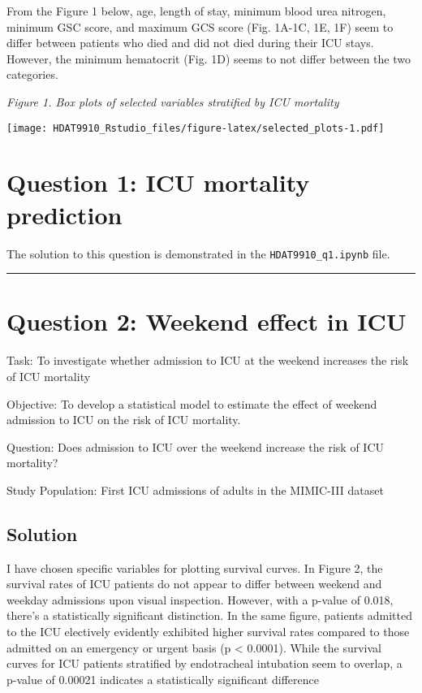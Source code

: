 \documentclass[
]{article}
\begin{document}
From the Figure 1 below, age, length of stay, minimum blood urea
nitrogen, minimum GSC score, and maximum GCS score (Fig. 1A-1C, 1E, 1F)
seem to differ between patients who died and did not died during their
ICU stays. However, the minimum hematocrit (Fig. 1D) seems to not differ
between the two categories.

\emph{Figure 1. Box plots of selected variables stratified by ICU
mortality}

\texttt{[image: HDAT9910\_Rstudio\_files/figure-latex/selected\_plots-1.pdf]}

\hypertarget{question-1-icu-mortality-prediction}{%
\section{Question 1: ICU mortality
prediction}\label{question-1-icu-mortality-prediction}}

The solution to this question is demonstrated in the
\texttt{HDAT9910\_q1.ipynb} file.

\begin{center}\rule{0.5\linewidth}{0.5pt}\end{center}

\hypertarget{question-2-weekend-effect-in-icu}{%
\section{Question 2: Weekend effect in
ICU}\label{question-2-weekend-effect-in-icu}}

Task: To investigate whether admission to ICU at the weekend increases
the risk of ICU mortality

Objective: To develop a statistical model to estimate the effect of
weekend admission to ICU on the risk of ICU mortality.

Question: Does admission to ICU over the weekend increase the risk of
ICU mortality?

Study Population: First ICU admissions of adults in the MIMIC-III
dataset

\hypertarget{solution}{%
\subsection{Solution}\label{solution}}

I have chosen specific variables for plotting survival curves. In Figure
2, the survival rates of ICU patients do not appear to differ between
weekend and weekday admissions upon visual inspection. However, with a
p-value of 0.018, there's a statistically significant distinction. In
the same figure, patients admitted to the ICU electively evidently
exhibited higher survival rates compared to those admitted on an
emergency or urgent basis (p \textless{} 0.0001). While the survival
curves for ICU patients stratified by endotracheal intubation seem to
overlap, a p-value of 0.00021 indicates a statistically significant
difference
\end{document}
